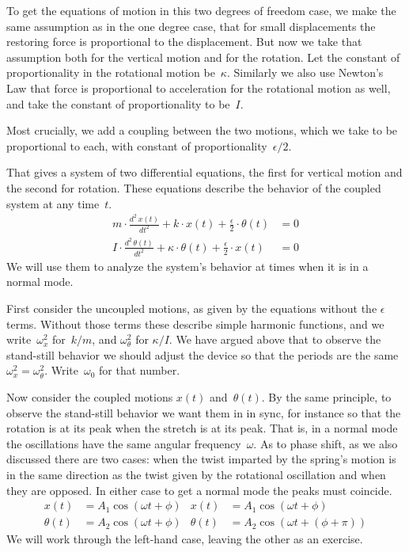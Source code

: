 To get the equations of motion in this two degrees of freedom case,
we make the same assumption as in the one degree case,
that for small displacements the restoring force is
proportional to the displacement. 
But now we take that assumption both for
the vertical motion and for the rotation.
Let the constant of proportionality in the rotational motion be~$\kappa$.
Similarly we also use Newton's Law that force is proportional to 
acceleration for the rotational motion as well, and take
the constant of proportionality to be~$I$. 

Most crucially, we add a coupling between the two
motions, which we take to be proportional to each, with constant of 
proportionality~$\epsilon/2$.

That gives a system of two differential equations,
the first for vertical motion and the second
for rotation.
These equations describe the behavior of the coupled system at any time~$t$.
\begin{equation*}
  \begin{split}
  m\cdot\frac{d^2\,x(t)}{dt^2}
      +k\cdot x(t)+\frac{\epsilon}{2}\cdot \theta(t) 
      &=0  \\
  I\cdot\frac{d^2\,\theta(t)}{dt^2}
      +\kappa\cdot \theta(t)+\frac{\epsilon}{2}\cdot x(t)  
      &=0
  \end{split}
  \tag{$**$}
\end{equation*}
We will use them to analyze the
system's behavior at times when it is in a normal mode.

First consider the uncoupled motions, as given by the equations without the
$\epsilon$ terms.
Without those terms these describe simple harmonic functions,
and we write~$\omega_x^2$ for~$k/m$, and $\omega_\theta^2$ for $\kappa/I$.
We have argued above that to observe the stand-still behavior we should 
adjust the device so that the periods are the same $\omega_x^2=\omega_\theta^2$. 
Write~$\omega_0$ for that number.

Now consider the coupled motions $x(t)$ and~$\theta(t)$.
By the same principle, to observe the stand-still behavior we want them in 
in sync, for instance so that the rotation is at its
peak when the stretch is at its peak.
That is, in a normal mode the oscillations have the same
angular frequency~$\omega$.
As to phase shift, as we also discussed there are two
cases: when the twist imparted by the spring's motion is in the same direction
as the twist given by the rotational oscillation and when they are opposed.
In either case to get a normal mode the peaks must coincide.
\begin{align*}
  x(t) &= A_1\cos(\omega t+\phi)  
       &x(t) &= A_1\cos(\omega t+\phi)   \\  
  \theta(t) &= A_2\cos(\omega t+\phi)  
       &\theta(t) &= A_2\cos(\omega t+(\phi+\pi))    
\end{align*}
We will work through the left-hand case, leaving the other as an exercise.

